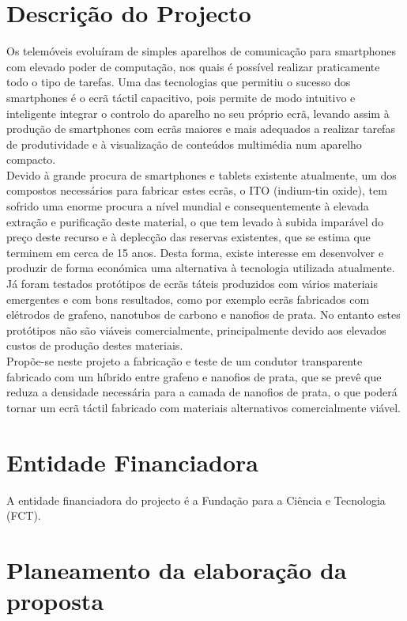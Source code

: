 \documentclass[%
	nofootinbib,
	amsmath,amssymb,
	aps,
	12pt,
	a4paper
]{article}
\begin{document}
\section{Descrição do Projecto}
Os telemóveis evoluíram de simples aparelhos de comunicação para smartphones com elevado poder de computação, nos quais é possível realizar praticamente todo o tipo de tarefas. Uma das tecnologias que permitiu o sucesso dos smartphones é o ecrã táctil capacitivo, pois permite de modo intuitivo e inteligente integrar o controlo do aparelho no seu próprio ecrã, levando assim à produção de smartphones com ecrãs maiores e mais adequados a realizar tarefas de produtividade e à visualização de conteúdos multimédia num aparelho compacto.\\
Devido à grande procura de smartphones e tablets existente atualmente, um dos compostos necessários para fabricar estes ecrãs, o ITO (indium-tin oxide), tem sofrido uma enorme procura a nível mundial e consequentemente à elevada extração e purificação deste material, o que tem levado à subida imparável do preço deste recurso e à deplecção das reservas existentes, que se estima que terminem em cerca de 15 anos. Desta forma, existe interesse em desenvolver e produzir de forma económica uma alternativa à tecnologia utilizada atualmente.\\
Já foram testados protótipos de ecrãs táteis produzidos com vários materiais emergentes e com bons resultados, como por exemplo ecrãs fabricados com elétrodos de grafeno, nanotubos de carbono e nanofios de prata. No entanto estes protótipos não são viáveis comercialmente, principalmente devido aos elevados custos de produção destes materiais.\\
Propõe-se neste projeto a fabricação e teste de um condutor transparente fabricado com um híbrido entre grafeno e nanofios de prata, que se prevê que reduza a densidade necessária para a camada de nanofios de prata, o que poderá tornar um ecrã táctil fabricado com materiais alternativos comercialmente viável.

\section{Entidade Financiadora}
A entidade financiadora do projecto é a Fundação para a Ciência e Tecnologia (FCT).

\section{Planeamento da elaboração da proposta}
\end{document}
